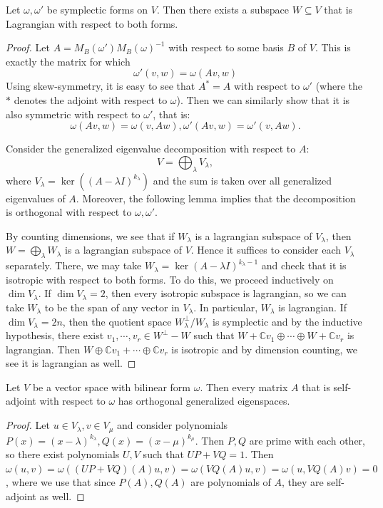 \documentclass{report}
\begin{document}
\begin{proposition}
    Let $\omega, \omega'$ be symplectic forms on $V$.
    Then there exists a subspace $W\subseteq V$ that is Lagrangian with respect to both forms.
\end{proposition}
\begin{proof}
    Let $A = M_B(\omega') M_B(\omega)^{-1}$ with respect to some basis $B$ of $V$.
    This is exactly the matrix for which
    \[
    \omega'(v,w) = \omega(Av, w)
    \]
    Using skew-symmetry, it is easy to see that $A^* = A$ with respect to $\omega'$ (where the $*$ denotes the adjoint with respect to $\omega$).
    Then we can similarly show that it is also symmetric with respect to $\omega'$, that is:
    \[
    \omega(Av, w) = \omega(v, Aw), \omega'(Av, w) = \omega'(v, Aw).
    \]
    
    Consider the generalized eigenvalue decomposition with respect to $A$:
    \[
    V = \bigoplus_{\lambda} V_\lambda,
    \]
    where $V_\lambda = \ker\left((A - \lambda I)^{k_\lambda}\right)$ and the sum is taken over all generalized eigenvalues of $A$.
    Moreover, the following lemma implies that the decomposition is orthogonal with respect to $\omega, \omega'$.

    By counting dimensions, we see that if $W_\lambda$ is a lagrangian subspace of $V_\lambda$, then $W = \bigoplus_\lambda W_\lambda$ is a lagrangian subspace of $V$.
    Hence it suffices to consider each $V_\lambda$ separately.
    There, we may take $W_\lambda = \ker(A - \lambda I)^{k_\lambda - 1}$ and check that it is isotropic with respect to both forms.
    To do this, we proceed inductively on $\dim V_\lambda$.
    If $\dim V_\lambda = 2$, then every isotropic subspace is lagrangian, so we can take $W_\lambda$ to be the span of any vector in $V_\lambda$.
    In particular, $W_\lambda$ is lagrangian.
    If $\dim V_\lambda = 2n$, then the quotient space $W_\lambda^\perp / W_\lambda$ is symplectic and by the inductive hypothesis, there exist $v_1, \cdots, v_r \in W^\perp - W$ such that $W + \mathbb C v_1 \oplus \cdots \oplus W + \mathbb C v_r$ is lagrangian.
    Then $W \oplus \mathbb C v_1 + \cdots \oplus \mathbb C v_r$ is isotropic and by dimension counting, we see it is lagrangian as well.
\end{proof}
\begin{lemma}
    Let $V$ be a vector space with bilinear form $\omega$.
    Then every matrix $A$ that is self-adjoint with respect to $\omega$ has orthogonal generalized eigenspaces.
\end{lemma}
\begin{proof}
    Let $u \in V_\lambda, v \in V_\mu$ and consider polynomials $P(x) = (x - \lambda)^{k_\lambda}, Q(x) = (x - \mu)^{k_\mu}$.
    Then $P, Q$ are prime with each other, so there exist polynomials $U, V$ such that $UP + VQ = 1$.
    Then $\omega(u,v) = \omega((UP + VQ)(A)u, v) = \omega(VQ(A)u, v) = \omega(u, VQ(A)v) = 0 $, where we use that since $P(A),Q(A)$ are polynomials of $A$, they are self-adjoint as well.
\end{proof}
\end{document}
